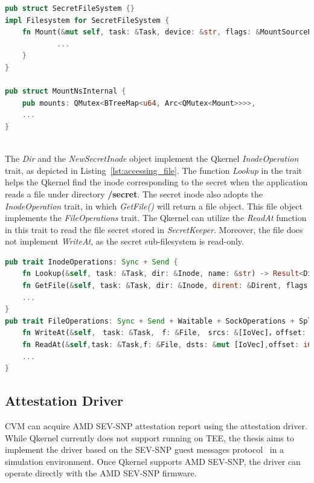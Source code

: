 \begin{lstlisting}[language=rust, caption= API for secret file system, label={lst:sub_filesystem}]
pub struct SecretFileSystem {}
impl Filesystem for SecretFileSystem {
    fn Mount(&mut self, task: &Task, device: &str, flags: &MountSourceFlags, data: &str) -> Result<Inode> {
            ...
    }
}

pub struct MountNsInternal {
    pub mounts: QMutex<BTreeMap<u64, Arc<QMutex<Mount>>>>,
    ...
}
      
\end{lstlisting}

The \emph{Dir} and the \emph{NewSecretInode} object implement the Qkernel \emph{InodeOperation} trait, as depicted in Listing~\ref{lst:accessing_file}. The function \emph{Lookup} in the trait helps the Qkernel find the inode corresponding to the secret when the application reads a file under 
directory \textbf{/secret}. The secret inode also adopts the \emph{InodeOperation} trait, in which \emph{GetFile()} will return a file object. This file object implements the \emph{FileOperations} trait. The Qkernel can utilize the \emph{ReadAt} function in this trait to read the file secret 
stored in \emph{SecretKeeper}. Moreover, the file does not implement \emph{WriteAt}, as the secret sub-filesystem is read-only.

\begin{lstlisting}[language=rust, caption= Interface for accessing the file type secrets, label={lst:accessing_file}]
pub trait InodeOperations: Sync + Send {
    fn Lookup(&self, task: &Task, dir: &Inode, name: &str) -> Result<Dirent>;
    fn GetFile(&self, task: &Task, dir: &Inode, dirent: &Dirent, flags: FileFlags) -> Result<File>;
    ...
}
pub trait FileOperations: Sync + Send + Waitable + SockOperations + SpliceOperations {
    fn WriteAt(&self,　task: &Task,　f: &File,　srcs: &[IoVec]，offset: i64,_blocking: bool) -> Result<i64>;
    fn ReadAt(&self,task: &Task,f: &File, dsts: &mut [IoVec],offset: i64, _blocking: bool,) -> Result<i64>;
    ...
}
\end{lstlisting}

\subsection{Attestation Driver}
\label{subsec:impl_Attestation_driver}
\acrshort{CVM} can acquire AMD SEV-SNP attestation report using the attestation driver. While Qkernel currently does not support running on \acrshort{TEE}, the thesis aims to implement the driver based on the SEV-SNP guest messages protocol~\cite*{snp_firmware} in a simulation environment. 
Once Qkernel supports AMD SEV-SNP, the driver can operate directly with the AMD SEV-SNP firmware. 


